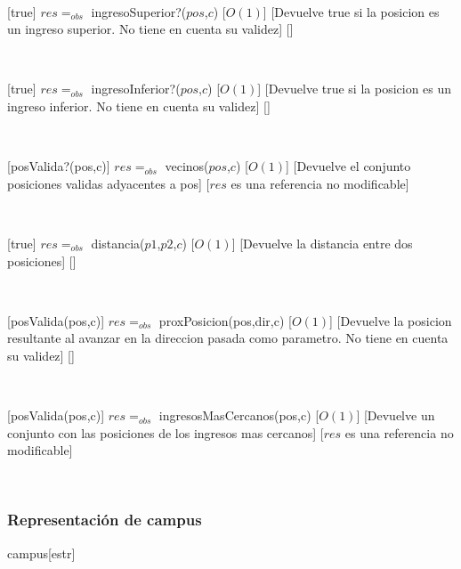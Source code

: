 ~

[true]
{$res =_{obs}$ ingresoSuperior?($pos$,$c$)}
[$O(1)$]
[Devuelve true si la posicion es un ingreso superior. No tiene en cuenta su validez]
[]

~

[true]
{$res =_{obs}$ ingresoInferior?($pos$,$c$)}
[$O(1)$]
[Devuelve true si la posicion es un ingreso inferior. No tiene en cuenta su validez]
[]

~

[posValida?(pos,c)]
{$res =_{obs}$ vecinos($pos$,$c$)}
[$O(1)$]
[Devuelve el conjunto posiciones validas adyacentes a pos]
[$res$ es una referencia no modificable]

~

[true]
{$res =_{obs}$ distancia($p1$,$p2$,$c$)}
[$O(1)$]
[Devuelve la distancia entre dos posiciones]
[]

~

[posValida(pos,c)]
{$res =_{obs}$ proxPosicion(pos,dir,c)}
[$O(1)$]
[Devuelve la posicion resultante al avanzar en la direccion pasada como parametro. No tiene en cuenta su validez]
[]

~

[posValida(pos,c)]
{$res =_{obs}$ ingresosMasCercanos(pos,c)}
[$O(1)$]
[Devuelve un conjunto con las posiciones de los ingresos mas cercanos]
[$res$ es una referencia no modificable]

~

\pagebreak

\subsubsection{Representación de campus}

\begin{Estructura}{campus}[estr]
	\begin{Tupla}[estr]
	\end{Tupla}
\end{Estructura}

